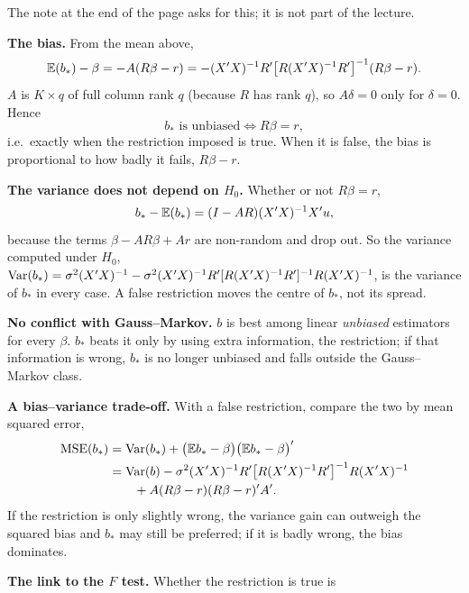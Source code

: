 \documentclass[11pt]{article}
\begin{document}
The note at the end of the page asks for this; it is not part of the lecture.

\begin{flatlist}
  \item \textbf{The bias.} From the mean above,
        \[ \mathbb{E}(b_{*}) - \beta = -A(R\beta - r)
           = -(X'X)^{-1}R'\bigl[R(X'X)^{-1}R'\bigr]^{-1}(R\beta - r). \]
        $A$ is $K\times q$ of full column rank $q$ (because $R$ has rank $q$), so
        $A\delta = 0$ only for $\delta = 0$. Hence
        \[ b_{*} \text{ is unbiased} \iff R\beta = r, \]
        i.e.\ exactly when the restriction imposed is true. When it is false, the bias
        is proportional to how badly it fails, $R\beta - r$.
  \item \textbf{The variance does not depend on $H_{0}$.} Whether or not $R\beta = r$,
        \[ b_{*} - \mathbb{E}(b_{*}) = (I - AR)(X'X)^{-1}X'u, \]
        because the terms $\beta - AR\beta + Ar$ are non-random and drop out. So the
        variance computed under $H_{0}$,
        $\operatorname{Var}(b_{*}) = \sigma^{2}(X'X)^{-1} - \sigma^{2}(X'X)^{-1}R'[R(X'X)^{-1}R']^{-1}R(X'X)^{-1}$,
        is the variance of $b_{*}$ in every case. A false restriction moves the
        centre of $b_{*}$, not its spread.
  \item \textbf{No conflict with Gauss--Markov.} $b$ is best among linear
        \emph{unbiased} estimators for every $\beta$. $b_{*}$ beats it only by
        using extra information, the restriction; if that information is wrong,
        $b_{*}$ is no longer unbiased and falls outside the Gauss--Markov class.
  \item \textbf{A bias--variance trade-off.} With a false restriction, compare the
        two by mean squared error,
        \[
        \begin{aligned}
        \operatorname{MSE}(b_{*}) &= \operatorname{Var}(b_{*}) + \bigl(\mathbb{E} b_{*} - \beta\bigr)\bigl(\mathbb{E} b_{*} - \beta\bigr)'\\
           &= \operatorname{Var}(b) - \sigma^{2}(X'X)^{-1}R'\bigl[R(X'X)^{-1}R'\bigr]^{-1}R(X'X)^{-1}
\\
           &\qquad + A(R\beta - r)(R\beta - r)'A'.
        \end{aligned}
        \]
        If the restriction is only slightly wrong, the variance gain can outweigh the
        squared bias and $b_{*}$ may still be preferred; if it is badly wrong, the
        bias dominates.
  \item \textbf{The link to the $F$ test.} Whether the restriction is true is

\end{flatlist}
\end{document}
